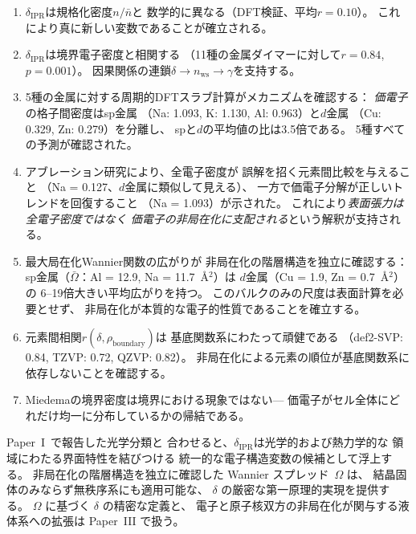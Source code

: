 \documentclass[twocolumn,showpacs,preprintnumbers,amsmath,amssymb,prb]{revtex4-2}
\begin{document}
\begin{enumerate}
  \item $\delta_\mathrm{IPR}$は規格化密度$n/\bar{n}$と
    数学的に異なる（DFT検証、平均$r = 0.10$）。
    これにより真に新しい変数であることが確立される。

  \item $\delta_\mathrm{IPR}$は境界電子密度と相関する
    （11種の金属ダイマーに対して$r = 0.84$, $p = 0.001$）。
    因果関係の連鎖$\delta \to n_\mathrm{ws} \to \gamma$を支持する。

  \item 5種の金属に対する周期的DFTスラブ計算がメカニズムを確認する：
    \emph{価電子}の格子間密度はsp金属
    （Na: 1.093, K: 1.130, Al: 0.963）と$d$金属
    （Cu: 0.329, Zn: 0.279）を分離し、
    spと$d$の平均値の比は3.5倍である。
    5種すべての予測が確認された。

  \item アブレーション研究により、全電子密度が
    誤解を招く元素間比較を与えること
    （Na = 0.127、$d$金属に類似して見える）、
    一方で価電子分解が正しいトレンドを回復すること
    （Na = 1.093）が示された。
    これにより\emph{表面張力は全電子密度ではなく
    価電子の非局在化に支配される}という解釈が支持される。

  \item 最大局在化Wannier関数の広がりが
    非局在化の階層構造を独立に確認する：
    sp金属（$\bar{\Omega}$：Al = 12.9, Na = 11.7~\AA$^2$）は
    $d$金属（Cu = 1.9, Zn = 0.7~\AA$^2$）の
    6--19倍大きい平均広がりを持つ。
    このバルクのみの尺度は表面計算を必要とせず、
    非局在化が本質的な電子的性質であることを確立する。

  \item 元素間相関$r(\delta, \rho_\mathrm{boundary})$は
    基底関数系にわたって頑健である
    （def2-SVP: 0.84, TZVP: 0.72, QZVP: 0.82）。
    非局在化による元素の順位が基底関数系に依存しないことを確認する。

  \item Miedemaの境界密度は境界における現象ではない---
    価電子がセル全体にどれだけ均一に分布しているかの帰結である。
\end{enumerate}

Paper~I~\cite{SentoOpticsPaper1}で報告した光学分類と
合わせると、$\delta_\mathrm{IPR}$は光学的および熱力学的な
領域にわたる界面特性を結びつける
統一的な電子構造変数の候補として浮上する。
非局在化の階層構造を独立に確認した Wannier スプレッド~$\Omega$ は、
結晶固体のみならず無秩序系にも適用可能な、
$\delta$ の厳密な第一原理的実現を提供する。
$\Omega$ に基づく $\delta$ の精密な定義と、
電子と原子核双方の非局在化が関与する液体系への拡張は
Paper~III で扱う。
\end{document}
